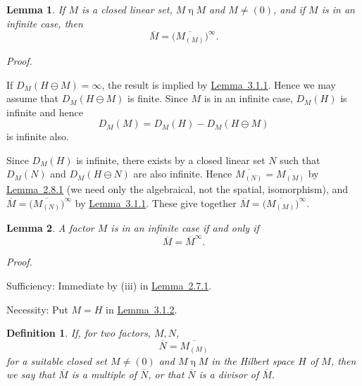 \documentclass[b5paper,twoside]{article}
\newcommand{\lemref}[2]{\hyperref[#1]{\mbox{Lemma~#2}}}
\theoremstyle{mvnplain}
\newtheorem{lemma}{Lemma}[section]
\newtheorem{definition}{Definition}[section]
\renewenvironment{proof}[1][Proof]{%
  \par\addvspace{0.35\baselineskip}%
  \noindent\textit{#1.}\ \normalfont\ignorespaces
}{%
  \par\addvspace{0.35\baselineskip}%
}
\newcommand{\M}{\mathbf M}
\newcommand{\N}{\mathbf N}
\newcommand{\Hilbert}{\mathfrak H}
\def\M{M}%
\def\N{N}%
\def\Hilbert{H}%
\def\mathfrak#1{#1}%
\begin{document}
\begin{lemma}\label{lem:3.1.2}
If \(\mathfrak M\) is a closed linear set, \(\mathfrak M\mathrel{\eta}\M\) and
\(\mathfrak M\ne(0)\), and if \(\M\) is in an infinite case, then
\[
  \overline{\M}=\bigl(\overline{\M_{(\mathfrak M)}}\bigr)^{\infty}.
\]
\end{lemma}

\begin{proof}
If \(D_{\M}(\Hilbert\ominus\mathfrak M)=\infty\), the result is implied by
\lemref{lem:3.1.1}{3.1.1}. Hence we may assume that
\(D_{\M}(\Hilbert\ominus\mathfrak M)\) is finite. Since \(\M\) is in an
infinite case, \(D_{\M}(\Hilbert)\) is infinite and hence
\[
  D_{\M}(\mathfrak M)=D_{\M}(\Hilbert)
    -D_{\M}(\Hilbert\ominus\mathfrak M)
\]
is infinite also.

Since \(D_{\M}(\Hilbert)\) is infinite, there exists by
\cite[p.~157, Lemma~7.2.3]{ref5} a closed linear set \(\mathfrak N\) such
that \(D_{\M}(\mathfrak N)\) and
\(D_{\M}(\Hilbert\ominus\mathfrak N)\) are also infinite. Hence
\(\overline{\M_{(\mathfrak N)}}=\overline{\M_{(\mathfrak M)}}\) by
\lemref{lem:2.8.1}{2.8.1} (we need only the algebraical, not the spatial,
isomorphism), and
\(\overline{\M}=\bigl(\overline{\M_{(\mathfrak N)}}\bigr)^\infty\) by
\lemref{lem:3.1.1}{3.1.1}. These give together
\(\overline{\M}=\bigl(\overline{\M_{(\mathfrak M)}}\bigr)^\infty\).
\end{proof}

\begin{lemma}\label{lem:3.1.3}
A factor \(\M\) is in an infinite case if and only if
\[
  \overline{\M}=\overline{\M}^{\infty}.
\]
\end{lemma}

\begin{proof}
Sufficiency: Immediate by (iii) in \lemref{lem:2.7.1}{2.7.1}.

Necessity: Put \(\mathfrak M=\Hilbert\) in \lemref{lem:3.1.2}{3.1.2}.
\end{proof}

\begin{definition}\label{def:3.1.1}
If, for two factors, \(\M,\N\),
\[
  \overline{\N}=\overline{\M_{(\mathfrak M)}}
\]
for a suitable closed set \(\mathfrak M\ne(0)\) and
\(\mathfrak M\mathrel{\eta}\M\) in the Hilbert space \(\Hilbert\) of \(\M\), then we
say that \(\overline{\M}\) is a \emph{multiple} of \(\overline{\N}\), or that
\(\overline{\N}\) is a \emph{divisor} of \(\overline{\M}\).
\end{definition}
\end{document}
